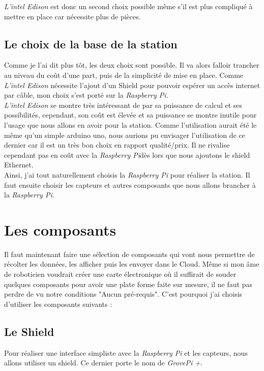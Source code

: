 \textit{L'intel Edison} est donc un second choix possible même s'il est plus compliqué à mettre en place car nécessite plus de pièces.

\subsection{Le choix de la base de la station}

Comme je l'ai dit plus tôt, les deux choix sont possible. Il va alors falloir trancher au niveau du coût d'une part, puis de la simplicité de mise en place. Comme \textit{L'intel Edison} nécessite l'ajout d'un Shield pour pouvoir espérer un accès internet par câble, mon choix s'est porté sur la \textit{Raspberry Pi}.\\

\textit{L'intel Edison} se montre très intéressant de par sa puissance de calcul et ses possibilités, cependant, son coût est élevée et sa puissance se montre inutile pour l'usage que nous allons en avoir pour la station. Comme l'utilisation aurait été le même qu'un simple arduino uno, nous aurions pu envisager l'utilisation de ce dernier car il est un très bon choix en rapport qualité/prix. Il ne rivalise cependant pas en coût avec la \textit{Raspberry Pi}dès lors que nous ajoutons le shield Ethernet.\\

Ainsi, j'ai tout naturellement choisis la \textit{Raspberry Pi} pour réaliser la station. Il faut ensuite choisir les capteurs et autres composants que nous allons brancher à la \textit{Raspberry Pi}.

\section{Les composants}

Il faut maintenant faire une sélection de composants qui vont nous permettre de récolter les données, les afficher puis les envoyer dans le Cloud. Même si mon âme de roboticien voudrait créer une carte électronique où il suffirait de souder quelques composants pour avoir une plate forme faite sur mesure, il ne faut pas perdre de vu notre conditions "Aucun pré-requis". C'est pourquoi j'ai choisis d'utiliser les composants suivants : 

\subsection{Le Shield}

Pour réaliser une interface simpliste avec la \textit{Raspberry Pi} et les capteurs, nous allons utiliser un shield. Ce dernier porte le nom de \textit{GrovePi +}. 

